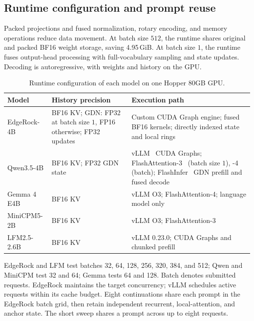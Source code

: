 \subsection{Runtime configuration and prompt reuse}
Packed projections and fused normalization, rotary encoding, and memory operations reduce data movement. At batch size $512$, the runtime shares original and packed BF16 weight storage, saving 4.95\,GiB. At batch size $1$, the runtime fuses output-head processing with full-vocabulary sampling and state updates. Decoding is autoregressive, with weights and history on the GPU.

\begin{table}[!htbp]
\centering\small
\caption{Runtime configuration of each model on one Hopper 80GB GPU.}
\label{tab:runtime-configurations}
\begin{tabularx}{\linewidth}{@{}>{\raggedright\arraybackslash}p{.20\linewidth}>{\raggedright\arraybackslash}p{.23\linewidth}Y@{}}
\toprule
Model & History precision & Execution path\\
\midrule
EdgeRock-4B & BF16 KV; GDN: FP32 at batch size $1$, FP16 otherwise; FP32 updates & Custom CUDA Graph engine; fused BF16 kernels; directly indexed state and local rings\\
\addlinespace[4pt]
Qwen3.5-4B & BF16 KV; FP32 GDN state & vLLM~\cite{pagedattention} CUDA Graphs; FlashAttention-3~\cite{flashattention3} (batch size $1$), -4~\cite{flashattention4} (batch); FlashInfer~\cite{flashinfer} GDN prefill and fused decode\\
\addlinespace[4pt]
Gemma 4 E4B & BF16 KV & vLLM O3; FlashAttention-4; language model only\\
\addlinespace[4pt]
MiniCPM5-2B & BF16 KV & vLLM O3; FlashAttention-3\\
\addlinespace[4pt]
LFM2.5-2.6B & BF16 KV & vLLM 0.23.0; CUDA Graphs and chunked prefill\\
\bottomrule
\end{tabularx}
\end{table}

EdgeRock and LFM test batches 32, 64, 128, 256, 320, 384, and 512; Qwen and MiniCPM test 32 and 64; Gemma tests 64 and 128. Batch denotes submitted requests. EdgeRock maintains the target concurrency; vLLM schedules active requests within its cache budget. Eight continuations share each prompt in the EdgeRock batch grid, then retain independent recurrent, local-attention, and anchor state. The short sweep shares a prompt across up to eight requests.

